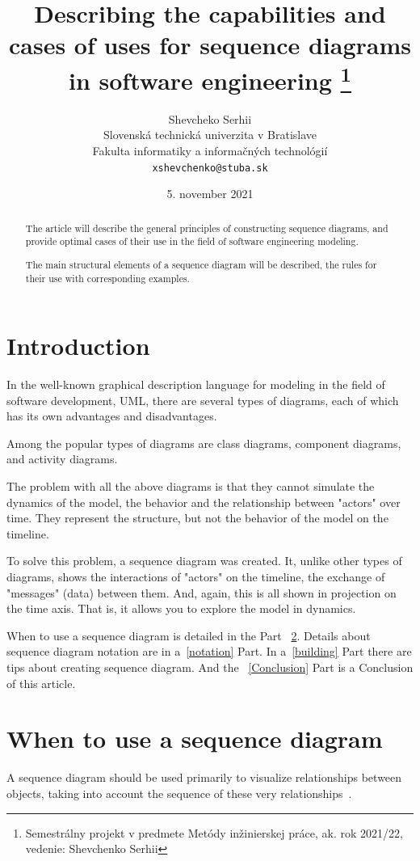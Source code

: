\documentclass[10pt,twoside,slovak,a4paper]{article}
\title{Describing the capabilities and cases of uses for sequence diagrams in software engineering \thanks{Semestrálny projekt v predmete Metódy inžinierskej práce, ak. rok 2021/22, vedenie: Shevchenko Serhii}} %
\author{Shevcheko Serhii\\[2pt]
	{\small Slovenská technická univerzita v Bratislave}\\
	{\small Fakulta informatiky a informačných technológií}\\
	{\small \texttt{xshevchenko@stuba.sk}}
	}
\date{\small 5. november 2021}
\begin{document}
\maketitle

\begin{abstract}
The article will describe the general principles of constructing sequence diagrams, and provide optimal cases of their use in the field of software engineering modeling.

The main structural elements of a sequence diagram will be described, the rules for their use with corresponding examples.
\end{abstract}



\section{Introduction}

In the well-known graphical description language for modeling in the field of software development, UML, there are several types of diagrams, each of which has its own advantages and disadvantages.

Among the popular types of diagrams are class diagrams, component diagrams, and activity diagrams.

The problem with all the above diagrams is that they cannot simulate the dynamics of the model, the behavior and the relationship between "actors" over time. They represent the structure, but not the behavior of the model on the timeline.

To solve this problem, a sequence diagram was created. It, unlike other types of diagrams, shows the interactions of "actors" on the timeline, the exchange of "messages" (data) between them. And, again, this is all shown in projection on the time axis. That is, it allows you to explore the model in dynamics.

When to use a sequence diagram is detailed in the Part ~\ref{when}. Details about sequence diagram notation are in a~\ref{notation} Part. In a~\ref{building} Part there are tips about creating sequence diagram. And the ~\ref{Conclusion} Part is a Conclusion of this article.

\section{When to use a sequence diagram} \label{when}
A sequence diagram should be used primarily to visualize relationships between objects, taking into account the sequence of these very relationships~\cite{IBM_SD}.
\end{document}
